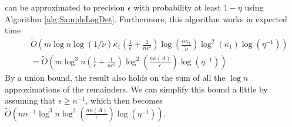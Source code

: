 can be approximated to precision $\epsilon$ with probability at least
$1-\eta$ using Algorithm \ref{alg:SampleLogDet}. Furthermore, this
algorithm works in expected time 
\begin{eqnarray*}
 &  & \tilde{O}\left(m\log n\log\left(1/\tilde{\nu}\right)\kappa_{1}\left(\frac{1}{\epsilon}+\frac{1}{n\epsilon^{2}}\right)\log\left(\frac{n\kappa_{1}}{\tilde{\nu}}\right)\log^{2}\left(\kappa_{1}\right)\log\left(\eta^{-1}\right)\right)\\
 &  & =\tilde{O}\left(m\log^{3}n\left(\frac{1}{\epsilon}+\frac{1}{n\epsilon^{2}}\right)\log^{2}\left(\frac{n\kappa\left(A\right)}{\epsilon}\right)\log\left(\eta^{-1}\right)\right)
\end{eqnarray*}
By a union bound, the result also holds on the sum of all the $\log n$
approximations of the remainders. We can simplify this bound a little
by assuming that $\epsilon\geq n^{-1}$, which then becomes $\tilde{O}\left(m\epsilon^{-1}\log^{3}n\log^{2}\left(\frac{n\kappa\left(A\right)}{\epsilon}\right)\log\left(\eta^{-1}\right)\right)$. 

